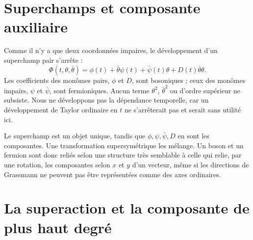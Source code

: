 \section{Superchamps et composante auxiliaire}

Comme il n’y a que deux coordonnées impaires, le développement d’un superchamp pair s’arrête :
\begin{equation}
\Phi(t,\theta,\bar\theta)
=\phi(t)+\bar\theta\psi(t)+\bar\psi(t)\theta
+D(t)\bar\theta\theta.
\label{eq:l7-superfield}
\end{equation}
Les coefficients des monômes pairs, \(\phi\) et \(D\), sont bosoniques ; ceux des monômes impairs, \(\psi\) et \(\bar\psi\), sont fermioniques. Aucun terme \(\theta^2\), \(\bar\theta^2\) ou d’ordre supérieur ne subsiste. Nous ne développons pas la dépendance temporelle, car un développement de Taylor ordinaire en \(t\) ne s’arrêterait pas et serait sans utilité ici.

\begin{classroomqa}
\end{classroomqa}

Le superchamp est un objet unique, tandis que \(\phi,\psi,\bar\psi,D\) en sont les composantes. Une transformation supersymétrique les mélange. Un boson et un fermion sont donc reliés selon une structure très semblable à celle qui relie, par une rotation, les composantes selon \(x\) et \(y\) d’un vecteur, même si les directions de Grassmann ne peuvent pas être représentées comme des axes ordinaires.

\section{La superaction et la composante de plus haut degré}

